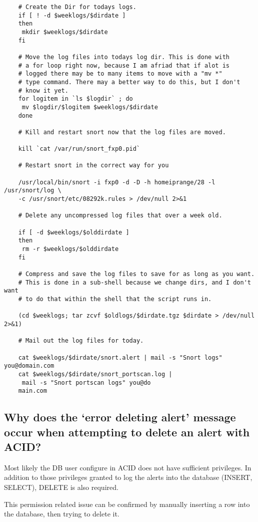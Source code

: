 \documentclass{article}
\begin{document}
\begin{verbatim}
    # Create the Dir for todays logs.
    if [ ! -d $weeklogs/$dirdate ]
    then
     mkdir $weeklogs/$dirdate
    fi
    
    # Move the log files into todays log dir. This is done with
    # a for loop right now, because I am afriad that if alot is
    # logged there may be to many items to move with a "mv *"
    # type command. There may a better way to do this, but I don't
    # know it yet.
    for logitem in `ls $logdir` ; do
     mv $logdir/$logitem $weeklogs/$dirdate
    done
    
    # Kill and restart snort now that the log files are moved.
 
    kill `cat /var/run/snort_fxp0.pid`
    
    # Restart snort in the correct way for you
 
    /usr/local/bin/snort -i fxp0 -d -D -h homeiprange/28 -l /usr/snort/log \
    -c /usr/snort/etc/08292k.rules > /dev/null 2>&1

    # Delete any uncompressed log files that over a week old.
 
    if [ -d $weeklogs/$olddirdate ]
    then
     rm -r $weeklogs/$olddirdate
    fi

    # Compress and save the log files to save for as long as you want.
    # This is done in a sub-shell because we change dirs, and I don't want 
    # to do that within the shell that the script runs in.

    (cd $weeklogs; tar zcvf $oldlogs/$dirdate.tgz $dirdate > /dev/null 2>&1)

    # Mail out the log files for today.

    cat $weeklogs/$dirdate/snort.alert | mail -s "Snort logs" you@domain.com
    cat $weeklogs/$dirdate/snort_portscan.log |
     mail -s "Snort portscan logs" you@do
    main.com
    \end{verbatim}

\subsection{Why does the `error deleting alert' message occur when attempting to delete an alert with ACID?  }

Most likely the DB user configure in ACID does not have sufficient
privileges. In addition to those privileges granted to log the alerts into
the database (INSERT, SELECT), DELETE is also required. 

This permission related issue can be confirmed by manually inserting a row
into the database, then trying to delete it. 
\end{document}
